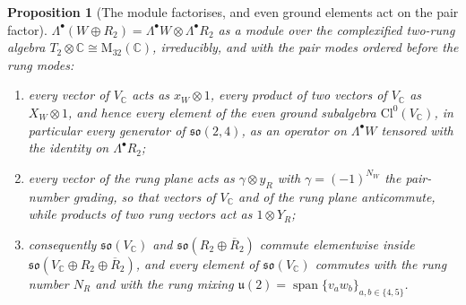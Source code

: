 \documentclass[11pt]{article}
\newtheorem{proposition}[theorem]{Proposition}
\theoremstyle{definition}
\theoremstyle{plain}
\providecommand{\C}{}\renewcommand{\C}{\mathbb{C}}
\providecommand{\Cl}{}\renewcommand{\Cl}{\mathrm{Cl}}
\providecommand{\so}{}\renewcommand{\so}{\mathfrak{so}}
\providecommand{\uu}{}\renewcommand{\uu}{\mathfrak{u}}
\begin{document}
\begin{proposition}[The module factorises, and even ground elements act on the pair factor]\label{c:standard-model.module-factorises-even-ground-elements-act}
$\Lambda^{\bullet}(W \oplus R_{2}) = \Lambda^{\bullet}W \otimes \Lambda^{\bullet}R_{2}$ as a module over the complexified two-rung algebra $T_{2} \otimes \C \cong \mathrm{M}_{32}(\C)$, irreducibly, and with the pair modes ordered before the rung modes:
\begin{enumerate}
\item[(1)] every vector of $V_{\C}$ acts as $x_{W} \otimes 1$, every product of two vectors of $V_{\C}$ as $X_{W} \otimes 1$, and hence every element of the even ground subalgebra $\Cl^{0}(V_{\C})$, in particular every generator of $\so(2,4)$, as an operator on $\Lambda^{\bullet}W$ tensored with the identity on $\Lambda^{\bullet}R_{2}$;
\item[(2)] every vector of the rung plane acts as $\gamma \otimes y_{R}$ with $\gamma = (-1)^{N_{W}}$ the pair-number grading, so that vectors of $V_{\C}$ and of the rung plane anticommute, while products of two rung vectors act as $1 \otimes Y_{R}$;
\item[(3)] consequently $\so(V_{\C})$ and $\so(R_{2} \oplus \overline{R}_{2})$ commute elementwise inside $\so(V_{\C} \oplus R_{2} \oplus \overline{R}_{2})$, and every element of $\so(V_{\C})$ commutes with the rung number $N_{R}$ and with the rung mixing $\uu(2) = \operatorname{span}\{v_{a}w_{b}\}_{a, b \in \{4, 5\}}$.
\end{enumerate}
\end{proposition}
\end{document}
